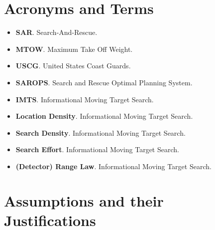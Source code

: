 \documentclass[12pt, letterpaper]{article}  %
\theoremstyle{definition}
\theoremstyle{remark}
\theoremstyle{plain}
\begin{document}
\section{Acronyms and Terms}\label{sec:terms}

\begin{itemize}
\item \textbf{SAR}. Search-And-Rescue.

\item \textbf{MTOW}. Maximum Take Off Weight.

\item \textbf{USCG}. United States Coast Guards.
\item \textbf{SAROPS}. Search and Rescue Optimal Planning System.
\item \textbf{IMTS}. Informational Moving Target Search.

\item \textbf{Location Density}. Informational Moving Target Search.
\item \textbf{Search Density}. Informational Moving Target Search.
\item \textbf{Search Effort}. Informational Moving Target Search.
\item \textbf{(Detector) Range Law}. Informational Moving Target Search.

\end{itemize}


\section{Assumptions and their Justifications}\label{sec:assumptions}
\end{document}
